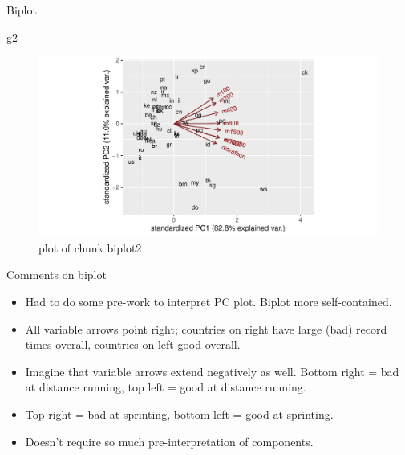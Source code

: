 \documentclass[ignorenonframetext,]{beamer}
\newenvironment{Shaded}{\begin{snugshade}}{\end{snugshade}}
\newcommand{\NormalTok}[1]{#1}
\begin{document}
\begin{frame}[fragile]{Biplot}
\protect\hypertarget{biplot-3}{}

\begin{Shaded}
\begin{Highlighting}[]
\NormalTok{g2}
\end{Highlighting}
\end{Shaded}

\begin{figure}
\centering
\includegraphics{figure/biplot2-1.pdf}
\caption{plot of chunk biplot2}
\end{figure}

\end{frame}

\begin{frame}{Comments on biplot}
\protect\hypertarget{comments-on-biplot}{}

\begin{itemize}
\item
  Had to do some pre-work to interpret PC plot. Biplot more
  self-contained.
\item
  All variable arrows point right; countries on right have large (bad)
  record times overall, countries on left good overall.
\item
  Imagine that variable arrows extend negatively as well. Bottom right =
  bad at distance running, top left = good at distance running.
\item
  Top right = bad at sprinting, bottom left = good at sprinting.
\item
  Doesn't require so much pre-interpretation of components.
\end{itemize}

\end{frame}
\end{document}
